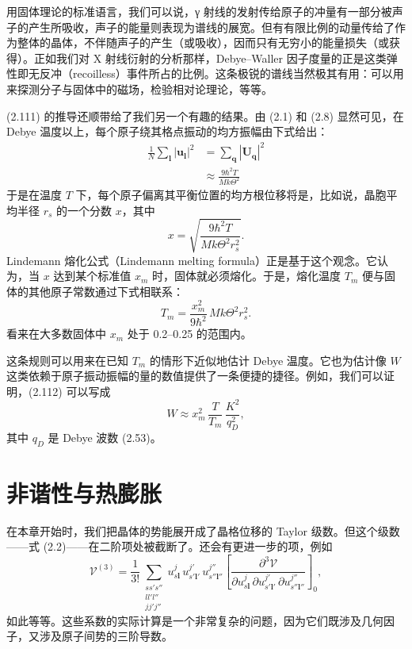 用固体理论的标准语言，我们可以说，γ 射线的发射传给原子的冲量有一部分被声子的产生所吸收，声子的能量则表现为谱线的展宽。但有有限比例的动量传给了作为整体的晶体，不伴随声子的产生（或吸收），因而只有无穷小的能量损失（或获得）。正如我们对 X 射线衍射的分析那样，Debye–Waller 因子度量的正是这类弹性即无反冲（recoilless）事件所占的比例。这条极锐的谱线当然极其有用：可以用来探测分子与固体中的磁场，检验相对论理论，等等。

(2.111) 的推导还顺带给了我们另一个有趣的结果。由 (2.1) 和 (2.8) 显然可见，在 Debye 温度以上，每个原子绕其格点振动的均方振幅由下式给出：
\begin{align*}
\frac{1}{N}\sum_{\mathbf{l}}|\mathbf{u}_{\mathbf{l}}|^{2}&=\sum_{\mathbf{q}}|\mathbf{U}_{\mathbf{q}}|^{2}\\
&\approx\frac{9\hbar^{2}T}{Mk\Theta^{2}}
\tag{2.115}
\end{align*}
于是在温度 $T$ 下，每个原子偏离其平衡位置的均方根位移将是，比如说，晶胞平均半径 $r_{s}$ 的一个分数 $x$，其中
\begin{equation*}
x=\sqrt{\frac{9\hbar^{2}T}{Mk\Theta^{2}r_{s}^{2}}}.
\tag{2.116}
\end{equation*}
Lindemann 熔化公式（Lindemann melting formula）正是基于这个观念。它认为，当 $x$ 达到某个标准值 $x_{m}$ 时，固体就必须熔化。于是，熔化温度 $T_{m}$ 便与固体的其他原子常数通过下式相联系：
\begin{equation*}
T_{m}=\frac{x_{m}^{2}}{9\hbar^{2}}\,Mk\Theta^{2}r_{s}^{2}.
\tag{2.117}
\end{equation*}
看来在大多数固体中 $x_{m}$ 处于 0.2–0.25 的范围内。

这条规则可以用来在已知 $T_{m}$ 的情形下近似地估计 Debye 温度。它也为估计像 $W$ 这类依赖于原子振动振幅的量的数值提供了一条便捷的捷径。例如，我们可以证明，(2.112) 可以写成
\begin{equation*}
W\approx x_{m}^{2}\,\frac{T}{T_{m}}\,\frac{K^{2}}{q_{D}^{2}},
\tag{2.118}
\end{equation*}
其中 $q_{D}$ 是 Debye 波数 (2.53)。

\section{非谐性与热膨胀}

在本章开始时，我们把晶体的势能展开成了晶格位移的 Taylor 级数。但这个级数——式 (2.2)——在二阶项处被截断了。还会有更进一步的项，例如
\begin{equation*}
\mathcal{V}^{(3)}=\frac{1}{3!}\sum_{\substack{ss's''\\ ll'l''\\ jj'j''}}u_{s\mathbf{l}}^{j}\,u_{s'\mathbf{l}'}^{j'}\,u_{s''\mathbf{l}''}^{j''}\left[\frac{\partial^{3}\mathcal{V}}{\partial u_{s\mathbf{l}}^{j}\,\partial u_{s'\mathbf{l}'}^{j'}\,\partial u_{s''\mathbf{l}''}^{j''}}\right]_{0},
\tag{2.119}
\end{equation*}
如此等等。这些系数的实际计算是一个非常复杂的问题，因为它们既涉及几何因子，又涉及原子间势的三阶导数。

